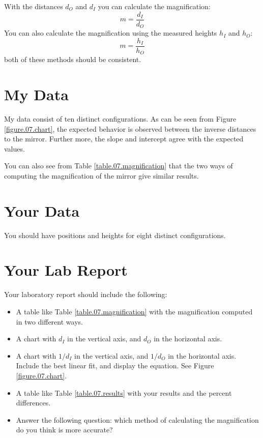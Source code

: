 With the distances $d_{O}$ and $d_{I}$ you can calculate the magnification:
\begin{equation}
    m = \frac{d_{I}}{d_{O}}
\end{equation}
You can also calculate the magnification using the measured heights $h_{I}$ and $h_{O}$:
\begin{equation}
    m = \frac{h_{I}}{h_{O}}
\end{equation}
both of these methods should be consistent.
\section{My Data}
My data consist of ten distinct configurations. As can be seen from Figure \ref{figure.07.chart}, the expected behavior is observed between the inverse distances to the mirror. Further more, the slope and intercept agree with the expected values.

You can also see from Table \ref{table.07.magnification} that the two ways of computing the magnification of the mirror give similar results.
\section{Your Data}
You should have positions and heights for eight distinct configurations.
\newpage
\section{Your Lab Report}
Your laboratory report should include the following:
\begin{itemize}
    \item A table like Table \ref{table.07.magnification} with the magnification computed in two different ways.
    \item A chart with $d_{I}$ in the vertical axis, and $d_{O}$ in the horizontal axis.
    \item A chart with $1/d_{I}$ in the vertical axis, and $1/d_{O}$ in the horizontal axis. Include the best linear fit, and display the equation. See Figure \ref{figure.07.chart}.
    \item A table like Table \ref{table.07.results} with your results and the percent differences.
    \item Answer the following question: which method of calculating the magnification do you think is more accurate?
\end{itemize}
\newpage
